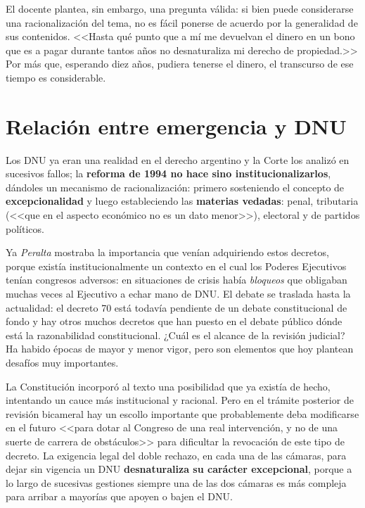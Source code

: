 \documentclass[12pt,oneside]{book}
\begin{document}
El docente plantea, sin embargo, una pregunta válida: si bien puede considerarse una racionalización del tema, no es fácil ponerse de acuerdo por la generalidad de sus contenidos. <<Hasta qué punto que a mí me devuelvan el dinero en un bono que es a pagar durante tantos años no desnaturaliza mi derecho de propiedad.>> Por más que, esperando diez años, pudiera tenerse el dinero, el transcurso de ese tiempo es considerable.

\section{Relación entre emergencia y DNU}

Los DNU ya eran una realidad en el derecho argentino y la Corte los analizó en sucesivos fallos; la \textbf{reforma de 1994 no hace sino institucionalizarlos}, dándoles un mecanismo de racionalización: primero sosteniendo el concepto de \textbf{excepcionalidad} y luego estableciendo las \textbf{materias vedadas}: penal, tributaria (<<que en el aspecto económico no es un dato menor>>), electoral y de partidos políticos.

Ya \textit{Peralta} mostraba la importancia que venían adquiriendo estos decretos, porque existía institucionalmente un contexto en el cual los Poderes Ejecutivos tenían congresos adversos: en situaciones de crisis había \textit{bloqueos} que obligaban muchas veces al Ejecutivo a echar mano de DNU. El debate se traslada hasta la actualidad: el decreto 70 está todavía pendiente de un debate constitucional de fondo y hay otros muchos decretos que han puesto en el debate público dónde está la razonabilidad constitucional. ¿Cuál es el alcance de la revisión judicial? Ha habido épocas de mayor y menor vigor, pero son elementos que hoy plantean desafíos muy importantes.

La Constitución incorporó al texto una posibilidad que ya existía de hecho, intentando un cauce más institucional y racional. Pero en el trámite posterior de revisión bicameral hay un escollo importante que probablemente deba modificarse en el futuro <<para dotar al Congreso de una real intervención, y no de una suerte de carrera de obstáculos>> para dificultar la revocación de este tipo de decreto. La exigencia legal del doble rechazo, en cada una de las cámaras, para dejar sin vigencia un DNU \textbf{desnaturaliza su carácter excepcional}, porque a lo largo de sucesivas gestiones siempre una de las dos cámaras es más compleja para arribar a mayorías que apoyen o bajen el DNU.
\end{document}
